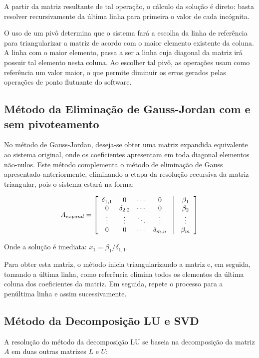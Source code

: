 \documentclass[a4paper,10pt]{report}
\begin{document}
A partir da matriz resultante de tal operação, o cálculo da solução é direto: basta resolver recursivamente da última linha para primeira o valor de cada incógnita.

O uso de um pivô determina que o sistema fará a escolha da linha de referência para triangularizar a matriz de acordo com o maior elemento existente da coluna. A linha com o maior elemento, passa a ser a linha cuja diagonal da matriz irá possuir tal elemento nesta coluna. Ao escolher tal pivô, as operações usam como referência um valor maior, o que permite diminuir os erros gerados pelas operações de ponto flutuante do software.

\subsection{Método da Eliminação de Gauss-Jordan com e sem pivoteamento}

No método de Gauss-Jordan, deseja-se obter uma matriz expandida equivalente ao sistema original, onde os coeficientes apresentam em toda diagonal elementos não-nulos. Este método complementa o método de eliminação de Gauss apresentado anteriormente, eliminando a etapa da resolução recursiva da matriz triangular, pois o sistema estará na forma:

\[
A_{expand} = \left[ \begin{array}{cccccc}
\delta_{1,1} & 0 & \cdots & 0 & \vline & \beta_{1} \\
0 & \delta_{2,2} & \cdots & 0 & \vline & \beta_{2} \\
\vdots  & \vdots & \ddots & \vdots & \vline & \vdots \\
0 & 0 & \cdots & \delta_{m,n} & \vline & \beta_{m} 
\label{arr:triangular}
\end{array}\right]
\]

Onde a solução é imediata: $x_{1} = \beta_{1}/\delta_{1,1}$.

Para obter esta matriz, o método inicia triangularizando a matriz e, em seguida, tomando a última linha, como referência elimina todos os elementos da última coluna dos coeficientes da matriz. Em seguida, repete o processo para a penúltima linha e assim sucessivamente.

\subsection{Método da Decomposição LU e SVD}

A resolução do método da decomposição LU se baseia na decomposição da matriz $A$ em duas outras matrizes $L$ e $U$:
\end{document}

